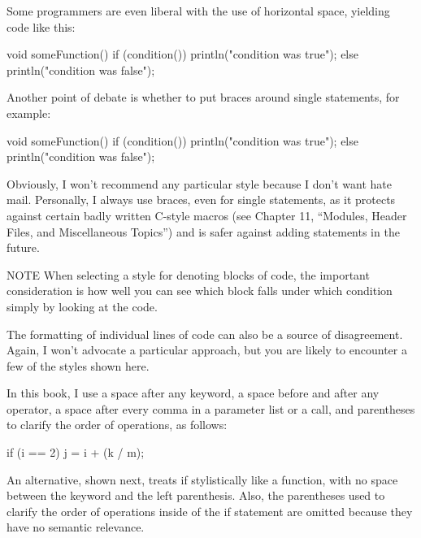 Some programmers are even liberal with the use of horizontal space, yielding code like this:

\begin{cpp}
void someFunction()
{
    if (condition())
    {
        println("condition was true");
    }
    else
    {
        println("condition was false");
    }
}
\end{cpp}

Another point of debate is whether to put braces around single statements, for example:

\begin{cpp}
void someFunction()
{
    if (condition())
        println("condition was true");
    else
        println("condition was false");
}
\end{cpp}

Obviously, I won’t recommend any particular style because I don’t want hate mail. Personally, I always use braces, even for single statements, as it protects against certain badly written C-style macros (see Chapter 11, “Modules, Header Files, and Miscellaneous Topics”) and is safer against adding statements in the future.

\begin{myNotic}{NOTE}
When selecting a style for denoting blocks of code, the important consideration is how well you can see which block falls under which condition simply by looking at the code.
\end{myNotic}


The formatting of individual lines of code can also be a source of disagreement. Again, I won’t advocate a particular approach, but you are likely to encounter a few of the styles shown here.

In this book, I use a space after any keyword, a space before and after any operator, a space after every comma in a parameter list or a call, and parentheses to clarify the order of operations, as follows:

\begin{cpp}
if (i == 2) {
    j = i + (k / m);
}
\end{cpp}

An alternative, shown next, treats if stylistically like a function, with no space between the keyword and the left parenthesis. Also, the parentheses used to clarify the order of operations inside of the if statement are omitted because they have no semantic relevance.

